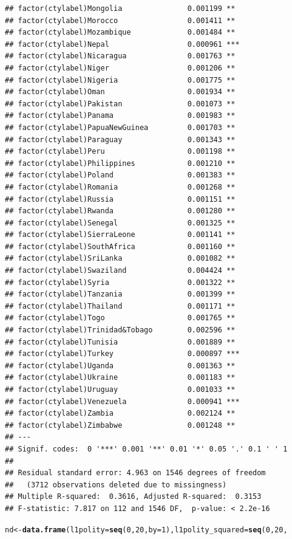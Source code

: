 \documentclass[12pt]{article}\usepackage[]{graphicx}\usepackage[]{color}
\makeatletter
\newcommand{\hlnum}[1]{\textcolor[rgb]{0.686,0.059,0.569}{#1}}%
\newcommand{\hlstd}[1]{\textcolor[rgb]{0.345,0.345,0.345}{#1}}%
\newcommand{\hlkwb}[1]{\textcolor[rgb]{0.69,0.353,0.396}{#1}}%
\newcommand{\hlkwc}[1]{\textcolor[rgb]{0.333,0.667,0.333}{#1}}%
\newcommand{\hlkwd}[1]{\textcolor[rgb]{0.737,0.353,0.396}{\textbf{#1}}}%
\newenvironment{kframe}{%
 \def\at@end@of@kframe{}%
 \ifinner\ifhmode%
  \def\at@end@of@kframe{\end{minipage}}%
  \begin{minipage}{\columnwidth}%
 \fi\fi%
 \def\FrameCommand##1{\hskip\@totalleftmargin \hskip-\fboxsep
 \colorbox{shadecolor}{##1}\hskip-\fboxsep
     \hskip-\linewidth \hskip-\@totalleftmargin \hskip\columnwidth}%
 \MakeFramed {\advance\hsize-\width
   \@totalleftmargin\z@ \linewidth\hsize
   \@setminipage}}%
 {\par\unskip\endMakeFramed%
 \at@end@of@kframe}
\newenvironment{knitrout}{}{} %
\makeatother
\begin{document}
\begin{knitrout}
\begin{kframe}
\begin{verbatim}
## factor(ctylabel)Mongolia               0.001199 ** 
## factor(ctylabel)Morocco                0.001411 ** 
## factor(ctylabel)Mozambique             0.001484 ** 
## factor(ctylabel)Nepal                  0.000961 ***
## factor(ctylabel)Nicaragua              0.001763 ** 
## factor(ctylabel)Niger                  0.001206 ** 
## factor(ctylabel)Nigeria                0.001775 ** 
## factor(ctylabel)Oman                   0.001934 ** 
## factor(ctylabel)Pakistan               0.001073 ** 
## factor(ctylabel)Panama                 0.001983 ** 
## factor(ctylabel)PapuaNewGuinea         0.001703 ** 
## factor(ctylabel)Paraguay               0.001343 ** 
## factor(ctylabel)Peru                   0.001198 ** 
## factor(ctylabel)Philippines            0.001210 ** 
## factor(ctylabel)Poland                 0.001383 ** 
## factor(ctylabel)Romania                0.001268 ** 
## factor(ctylabel)Russia                 0.001151 ** 
## factor(ctylabel)Rwanda                 0.001280 ** 
## factor(ctylabel)Senegal                0.001325 ** 
## factor(ctylabel)SierraLeone            0.001141 ** 
## factor(ctylabel)SouthAfrica            0.001160 ** 
## factor(ctylabel)SriLanka               0.001082 ** 
## factor(ctylabel)Swaziland              0.004424 ** 
## factor(ctylabel)Syria                  0.001322 ** 
## factor(ctylabel)Tanzania               0.001399 ** 
## factor(ctylabel)Thailand               0.001171 ** 
## factor(ctylabel)Togo                   0.001765 ** 
## factor(ctylabel)Trinidad&Tobago        0.002596 ** 
## factor(ctylabel)Tunisia                0.001889 ** 
## factor(ctylabel)Turkey                 0.000897 ***
## factor(ctylabel)Uganda                 0.001363 ** 
## factor(ctylabel)Ukraine                0.001183 ** 
## factor(ctylabel)Uruguay                0.001033 ** 
## factor(ctylabel)Venezuela              0.000941 ***
## factor(ctylabel)Zambia                 0.002124 ** 
## factor(ctylabel)Zimbabwe               0.001248 ** 
## ---
## Signif. codes:  0 '***' 0.001 '**' 0.01 '*' 0.05 '.' 0.1 ' ' 1
## 
## Residual standard error: 4.963 on 1546 degrees of freedom
##   (3712 observations deleted due to missingness)
## Multiple R-squared:  0.3616,	Adjusted R-squared:  0.3153 
## F-statistic: 7.817 on 112 and 1546 DF,  p-value: < 2.2e-16
\end{verbatim}
\begin{alltt}
\hlstd{nd} \hlkwb{<-} \hlkwd{data.frame}\hlstd{(}\hlkwc{l1polity} \hlstd{=} \hlkwd{seq}\hlstd{(}\hlnum{0}\hlstd{,} \hlnum{20}\hlstd{,} \hlkwc{by} \hlstd{=} \hlnum{1}\hlstd{),} \hlkwc{l1polity_squared} \hlstd{=} \hlkwd{seq}\hlstd{(}\hlnum{0}\hlstd{,} \hlnum{20}\hlstd{,}

\end{alltt}
\end{kframe}
\end{knitrout}
\end{document}
